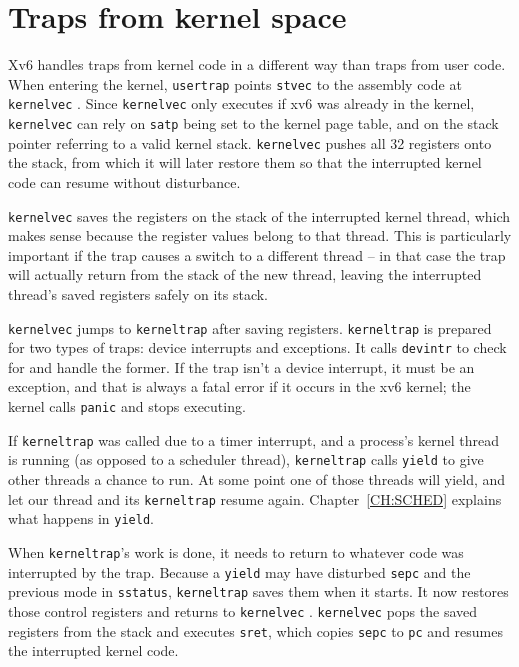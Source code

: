 \section{Traps from kernel space}
\label{s:ktraps}

Xv6 handles traps from kernel code in a different way
than traps from user code.
When entering the kernel, {\tt usertrap} points {\tt stvec}
to the assembly code at {\tt kernelvec}
.
Since {\tt kernelvec} only executes if
xv6 was already in the kernel, {\tt kernelvec} can rely
on {\tt satp} being set to the kernel page table, and on the
stack pointer referring to a valid kernel stack.
{\tt kernelvec} pushes all 32 registers onto the stack,
from which it will later restore them
so that the interrupted
kernel code can resume without disturbance.

{\tt kernelvec} saves the registers on the stack of the interrupted
kernel thread, which makes sense because the register values belong to
that thread. This is particularly important if the trap causes a
switch to a different thread -- in that case the trap will actually
return from the stack of the new thread, leaving the interrupted
thread's saved registers safely on its stack.

{\tt kernelvec} jumps to {\tt kerneltrap}
 after saving registers.
{\tt kerneltrap} is prepared for two types of traps:
device interrupts and exceptions. It calls
{\tt devintr}
to check for and handle the former.
If the trap isn't a device interrupt, it must be an exception,
and that is always a fatal error if it occurs in the xv6 kernel;
the kernel calls \lstinline{panic} and stops executing.

If {\tt kerneltrap} was called due to a timer interrupt, and a
process's kernel thread is running (as opposed to a scheduler thread),
{\tt kerneltrap} calls {\tt yield} to give other threads a chance to
run. At some point one of those threads will yield, and let our thread
and its {\tt kerneltrap} resume again.
Chapter~\ref{CH:SCHED} explains what happens in {\tt yield}.

When {\tt kerneltrap}'s work is done, it needs to return to whatever
code was interrupted by the trap. Because a {\tt yield} may have
disturbed {\tt sepc} and the previous mode in {\tt sstatus},
{\tt kerneltrap} saves them when it starts. It now restores those
control registers and returns to {\tt kernelvec}
.
{\tt kernelvec} pops the saved registers from the stack and
executes {\tt sret}, which copies {\tt sepc} to {\tt pc}
and resumes the interrupted kernel code.

